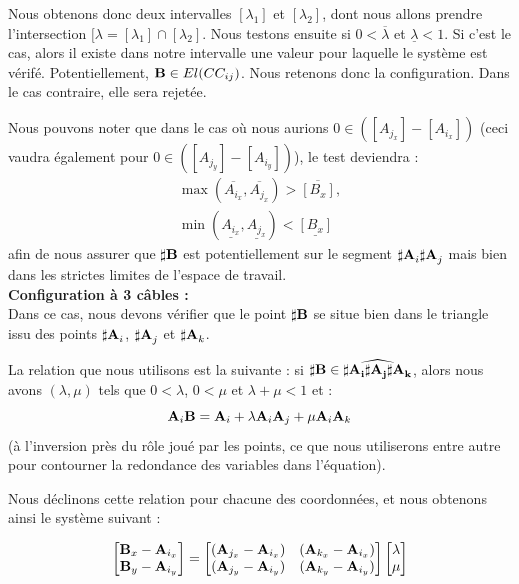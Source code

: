Nous obtenons donc deux intervalles $[\lambda_1]$ et $[\lambda_2]$, dont nous 
allons prendre l'intersection $[\lambda = [\lambda_1] \cap [\lambda_2]$. Nous 
testons ensuite si $0 < \overline{\lambda}$ et $\underline{\lambda} < 1$. Si 
c'est le cas, alors il existe dans notre intervalle une valeur pour laquelle le 
syst\`eme est v\'erif\'e. Potentiellement, ${\bf B} \in El(CC_{ij})$. Nous 
retenons donc la configuration. Dans le cas contraire, elle sera rejet\'ee.

Nous pouvons noter que dans le cas o\`u nous aurions $0 \in ([A_{j_x}] - 
[A_{i_x}])$ (ceci vaudra \'egalement pour $0 \in ([A_{j_y}] - [A_{i_y}])$), le 
test deviendra :
\begin{equation}
\begin{matrix}
\max(\overline{A_{i_x}},\overline{A_{j_x}}) > \overline{[B_x]},\\
\min(\underline{A_{i_x}},\underline{A_{j_x}}) < \underline{[B_x]}
\end{matrix}
\label{chap01:eq17}
\end{equation}
afin de nous assurer que ${\bf \sharp B}$ est potentiellement sur le segment 
${\bf \sharp A}_i{\bf \sharp A}_j$ mais bien dans les strictes limites de 
l'espace de travail.\\

{\bf Configuration \`a 3 c\^ables :}\\

Dans ce cas, nous devons v\'erifier que le point $\bf \sharp B$ se situe bien 
dans le triangle issu des points ${\bf \sharp A}_i$, ${\bf \sharp A}_j$ et 
${\bf \sharp A}_k$.

La relation que nous utilisons est la suivante : si $\bf \sharp B \in 
\widehat{{\bf \sharp A}_i{\bf \sharp A}_j{\bf \sharp A}_k}$, alors nous avons 
$(\lambda, \mu)$ tels que $0 < \lambda$, $0 < \mu$ et $\lambda + \mu < 1$ et :
\begin{equation}
{\bf A}_i {\bf B} = {\bf A}_i + \lambda {\bf A}_i{\bf A}_j + \mu {\bf A}_i{\bf 
A}_k  
\label{chap01:eq17}
\end{equation}
(\`a l'inversion pr\`es du r\^ole jou\'e par les points, ce que nous 
utiliserons entre autre pour contourner la redondance des variables dans 
l'\'equation).

Nous d\'eclinons cette relation pour chacune des coordonn\'ees, et nous 
obtenons ainsi le syst\`eme suivant :

\begin{equation}
\begin{bmatrix}
{\bf B}_{x} - {\bf A}_{i_x} \\
{\bf B}_{y} - {\bf A}_{i_y}
\end{bmatrix} =
\begin{bmatrix}
({\bf A}_{j_x} - {\bf A}_{i_x}) & ({\bf A}_{k_x} - {\bf A}_{i_x}) \\
({\bf A}_{j_y} - {\bf A}_{i_y}) & ({\bf A}_{k_y} - {\bf A}_{i_y})
\end{bmatrix}
\begin{bmatrix}
\lambda \\
\mu
\end{bmatrix}
\label{chap01:eq18}
\end{equation}

